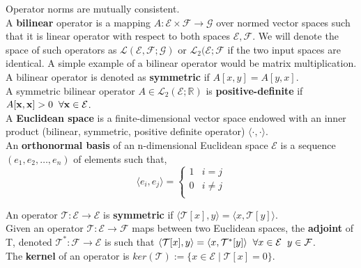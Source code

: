 \documentclass[a4paper]{article}
\begin{document}
\noindent Operator norms are mutually consistent.\\

\noindent A \textbf{bilinear} operator is a mapping $A:\mathcal{E}\times\mathcal{F}\rightarrow\mathcal{G}$ over normed vector spaces such that it is linear operator with respect to both spaces $\mathcal{E},\mathcal{F}$. We will denote the space of such operators as $\mathcal{L}(\mathcal{E},\mathcal{F};\mathcal{G})$ or $\mathcal{L}_{2}(\mathcal{E};\mathcal{F}$ if the two input spaces are identical. A simple example of a bilinear operator would be matrix multiplication. A bilinear operator is denoted as \textbf{symmetric} if $A[x,y] = A[y,x]$.\\

\noindent A symmetric bilinear operator $A\in\mathcal{L}_{2}(\mathcal{E};\mathbb{R})$ is \textbf{positive-definite} if $A[\mathbf{x,x}] > 0\hspace{2mm}\forall\mathbf{x}\in\mathcal{E}$.\\

\noindent A \textbf{Euclidean space} is a finite-dimensional vector space endowed with an inner product (bilinear, symmetric, positive definite operator) $\langle\cdot,\cdot\rangle$.\\

\noindent An \textbf{orthonormal basis} of an n-dimensional Euclidean space $\mathcal{E}$ is a sequence $(e_{1},e_{2},\ldots,e_{n})$ of elements such that,
$$
\langle e_{i},e_{j}\rangle = 
\begin{cases}
1 & i = j\\
0 & i\neq j\\
\end{cases}
$$

\noindent An operator $\mathcal{T}:\mathcal{E}\rightarrow\mathcal{E}$ is \textbf{symmetric} if $\langle \mathcal{T}[x],y\rangle = \langle x,\mathcal{T}[y]\rangle$.\\

\noindent Given an operator $\mathcal{T}:\mathcal{E}\rightarrow\mathcal{F}$ maps between two Euclidean spaces, the \textbf{adjoint} of T, denoted $\mathcal{T}^{*}:\mathcal{F}\rightarrow\mathcal{E}$ is such that $\langle \mathcal{T}[x],y\rangle = \langle x, \mathcal{T}^{*}[y]\rangle\hspace{2mm}\forall x\in\mathcal{E}\hspace{2mm}y\in\mathcal{F}$.\\

\noindent The \textbf{kernel} of an operator is $ker(\mathcal{T}) := \{x\in\mathcal{E}\mid\mathcal{T}[x] = 0\}$.\\
\end{document}
